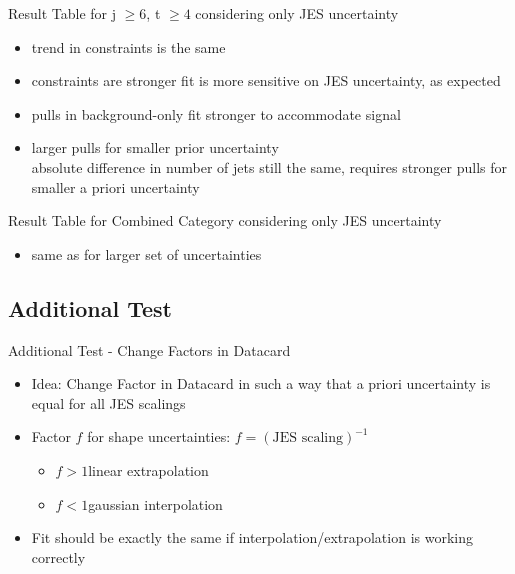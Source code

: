 \begin{frame}{Result Table for j $\geq 6$, t $\geq 4$ considering only JES uncertainty}

\begin{itemize}
\item trend in constraints is the same
\item constraints are stronger \rar fit is more sensitive on JES uncertainty, as expected
\item pulls in background-only fit stronger to accommodate signal
\item larger pulls for smaller prior uncertainty\\
\rar absolute difference in number of jets still the same, requires stronger pulls for smaller a priori uncertainty
\end{itemize}
\end{frame}



\begin{frame}{Result Table for Combined Category considering only JES uncertainty}

\begin{itemize}
\item same as for larger set of uncertainties
\end{itemize}
\end{frame}

\subsection{Additional Test}
\begin{frame}{Additional Test - Change Factors in Datacard}
\begin{itemize}
\item Idea: Change Factor in Datacard in such a way that a priori uncertainty is equal for all JES scalings\\

\item Factor $f$ for shape uncertainties: $f = (\text{JES scaling})^{-1}$
\begin{itemize}
\item $f>1$\rar linear extrapolation\\
\item $f<1$\rar gaussian interpolation

\end{itemize}
\item Fit should be exactly the same if interpolation/extrapolation is working correctly
\end{itemize}
\end{frame}

